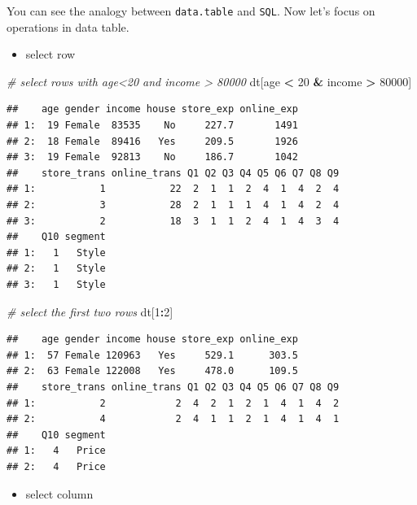 \documentclass[12pt,]{krantz}
\makeatletter
\newenvironment{Shaded}{\begin{snugshade}}{\end{snugshade}}
\newcommand{\CommentTok}[1]{\textcolor[rgb]{0.37,0.37,0.37}{\textit{#1}}}
\newcommand{\DecValTok}[1]{\textcolor[rgb]{0.06,0.06,0.06}{#1}}
\newcommand{\NormalTok}[1]{#1}
\newcommand{\OperatorTok}[1]{\textcolor[rgb]{0.43,0.43,0.43}{\textbf{#1}}}
\newcommand{\StringTok}[1]{\textcolor[rgb]{0.5,0.5,0.5}{#1}}
\providecommand{\tightlist}{%
  \setlength{\itemsep}{0pt}\setlength{\parskip}{0pt}}
\newenvironment{kframe}{%
\medskip{}
\setlength{\fboxsep}{.8em}
 \def\at@end@of@kframe{}%
 \ifinner\ifhmode%
  \def\at@end@of@kframe{\end{minipage}}%
  \begin{minipage}{\columnwidth}%
 \fi\fi%
 \def\FrameCommand##1{\hskip\@totalleftmargin \hskip-\fboxsep
 \colorbox{shadecolor}{##1}\hskip-\fboxsep
     \hskip-\linewidth \hskip-\@totalleftmargin \hskip\columnwidth}%
 \MakeFramed {\advance\hsize-\width
   \@totalleftmargin\z@ \linewidth\hsize
   \@setminipage}}%
 {\par\unskip\endMakeFramed%
 \at@end@of@kframe}
\renewenvironment{Shaded}{\begin{kframe}}{\end{kframe}}
\makeatother
\begin{document}
You can see the analogy between \texttt{data.table} and \texttt{SQL}. Now let's focus on operations in data table.

\begin{itemize}
\tightlist
\item
  select row
\end{itemize}

\begin{Shaded}
\begin{Highlighting}[]
\CommentTok{# select rows with age<20 and income > 80000}
\NormalTok{dt[age }\OperatorTok{<}\StringTok{ }\DecValTok{20} \OperatorTok{&}\StringTok{ }\NormalTok{income }\OperatorTok{>}\StringTok{ }\DecValTok{80000}\NormalTok{]}
\end{Highlighting}
\end{Shaded}

\begin{verbatim}
##    age gender income house store_exp online_exp
## 1:  19 Female  83535    No     227.7       1491
## 2:  18 Female  89416   Yes     209.5       1926
## 3:  19 Female  92813    No     186.7       1042
##    store_trans online_trans Q1 Q2 Q3 Q4 Q5 Q6 Q7 Q8 Q9
## 1:           1           22  2  1  1  2  4  1  4  2  4
## 2:           3           28  2  1  1  1  4  1  4  2  4
## 3:           2           18  3  1  1  2  4  1  4  3  4
##    Q10 segment
## 1:   1   Style
## 2:   1   Style
## 3:   1   Style
\end{verbatim}

\begin{Shaded}
\begin{Highlighting}[]
\CommentTok{# select the first two rows}
\NormalTok{dt[}\DecValTok{1}\OperatorTok{:}\DecValTok{2}\NormalTok{]}
\end{Highlighting}
\end{Shaded}

\begin{verbatim}
##    age gender income house store_exp online_exp
## 1:  57 Female 120963   Yes     529.1      303.5
## 2:  63 Female 122008   Yes     478.0      109.5
##    store_trans online_trans Q1 Q2 Q3 Q4 Q5 Q6 Q7 Q8 Q9
## 1:           2            2  4  2  1  2  1  4  1  4  2
## 2:           4            2  4  1  1  2  1  4  1  4  1
##    Q10 segment
## 1:   4   Price
## 2:   4   Price
\end{verbatim}

\begin{itemize}
\tightlist
\item
  select column
\end{itemize}
\end{document}

